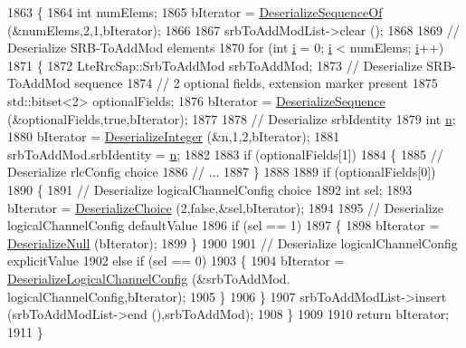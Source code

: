 \begin{DoxyCode}
1863 \{
1864   \textcolor{keywordtype}{int} numElems;
1865   bIterator = \hyperlink{classns3_1_1Asn1Header_a1a7245e05b482df8abade0a060bd0ecc}{DeserializeSequenceOf} (&numElems,2,1,bIterator);
1866 
1867   srbToAddModList->clear ();
1868 
1869   \textcolor{comment}{// Deserialize SRB-ToAddMod elements}
1870   \textcolor{keywordflow}{for} (\textcolor{keywordtype}{int} \hyperlink{bernuolliDistribution_8m_a6f6ccfcf58b31cb6412107d9d5281426}{i} = 0; \hyperlink{bernuolliDistribution_8m_a6f6ccfcf58b31cb6412107d9d5281426}{i} < numElems; \hyperlink{bernuolliDistribution_8m_a6f6ccfcf58b31cb6412107d9d5281426}{i}++)
1871     \{
1872       LteRrcSap::SrbToAddMod srbToAddMod;
1873       \textcolor{comment}{// Deserialize SRB-ToAddMod sequence}
1874       \textcolor{comment}{// 2 optional fields, extension marker present}
1875       std::bitset<2> optionalFields;
1876       bIterator = \hyperlink{classns3_1_1Asn1Header_a58c68bb97ba3fe2e8fcdd7c208d672b2}{DeserializeSequence} (&optionalFields,\textcolor{keyword}{true},bIterator);
1877 
1878       \textcolor{comment}{// Deserialize srbIdentity}
1879       \textcolor{keywordtype}{int} \hyperlink{namespacesample-rng-plot_aeb5ee5c431e338ef39b7ac5431242e1d}{n};
1880       bIterator = \hyperlink{classns3_1_1Asn1Header_a49802c9af30018b078150e866b6ecae2}{DeserializeInteger} (&n,1,2,bIterator);
1881       srbToAddMod.srbIdentity = \hyperlink{namespacesample-rng-plot_aeb5ee5c431e338ef39b7ac5431242e1d}{n};
1882 
1883       \textcolor{keywordflow}{if} (optionalFields[1])
1884         \{
1885           \textcolor{comment}{// Deserialize rlcConfig choice}
1886           \textcolor{comment}{// ...}
1887         \}
1888 
1889       \textcolor{keywordflow}{if} (optionalFields[0])
1890         \{
1891           \textcolor{comment}{// Deserialize logicalChannelConfig choice}
1892           \textcolor{keywordtype}{int} sel;
1893           bIterator = \hyperlink{classns3_1_1Asn1Header_a0af5881f07a0549a8693a1b75c229a90}{DeserializeChoice} (2,\textcolor{keyword}{false},&sel,bIterator);
1894 
1895           \textcolor{comment}{// Deserialize logicalChannelConfig defaultValue}
1896           \textcolor{keywordflow}{if} (sel == 1)
1897             \{
1898               bIterator = \hyperlink{classns3_1_1Asn1Header_a29bd4508f3f1ef636b3480f524fac0ce}{DeserializeNull} (bIterator);
1899             \}
1900 
1901           \textcolor{comment}{// Deserialize logicalChannelConfig explicitValue}
1902           \textcolor{keywordflow}{else} \textcolor{keywordflow}{if} (sel == 0)
1903             \{
1904               bIterator = \hyperlink{classns3_1_1RrcAsn1Header_a2391dd6be784d7a4886d3d70bc8718b4}{DeserializeLogicalChannelConfig} (&srbToAddMod.
      logicalChannelConfig,bIterator);
1905             \}
1906         \}
1907       srbToAddModList->insert (srbToAddModList->end (),srbToAddMod);
1908     \}
1909 
1910   \textcolor{keywordflow}{return} bIterator;
1911 \}
\end{DoxyCode}


